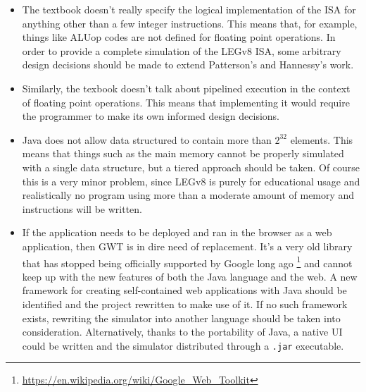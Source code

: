\begin{itemize}
 	\item The textbook doesn't really specify the logical implementation of the ISA for anything other than a few integer instructions. This means that, for example, things like ALUop codes are not defined for floating point operations. In order to provide a complete simulation of the LEGv8 ISA, some arbitrary design decisions should be made to extend Patterson's and Hannessy's work.
 	\item Similarly, the texbook doesn't talk about pipelined execution in the context of floating point operations. This means that implementing it would require the programmer to make its own informed design decisions.
 	\item Java does not allow data structured to contain more than $2^{32}$ elements. This means that things such as the main memory cannot be properly simulated with a single data structure, but a tiered approach should be taken. Of course this is a very minor problem, since LEGv8 is purely for educational usage and realistically no program using more than a moderate amount of memory and instructions will be written.
 	\item If the application needs to be deployed and ran in the browser as a web application, then GWT is in dire need of replacement. It's a very old library that has stopped being officially supported by Google long ago \footnote{\url{https://en.wikipedia.org/wiki/Google_Web_Toolkit}} and cannot keep up with the new features of both the Java language and the web. A new framework for creating self-contained web applications with Java should be identified and the project rewritten to make use of it. If no such framework exists, rewriting the simulator into another language should be taken into consideration. Alternatively, thanks to the portability of Java, a native UI could be written and the simulator distributed through a \verb|.jar| executable.
\end{itemize}
